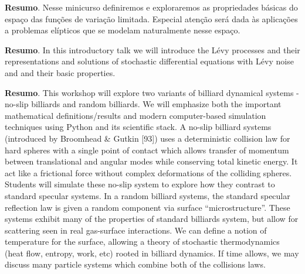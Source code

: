 	\vspace{24pt}


	
	
	\noindent\textbf{Resumo}.\label{mtop} 
	Nesse minicurso definiremos e exploraremos as propriedades básicas do espaço das funções de variação limitada. Especial atenção será dada às aplicações a problemas elípticos que se modelam naturalmente nesse espaço.
	
	\vspace{24pt}
	
	
	
	\noindent\textbf{Resumo}.\label{mah} 
	In this introductory talk we will introduce the Lévy processes and their representations and solutions of stochastic differential equations with Lévy noise and and their basic properties. 
	
	\vspace{24pt}

	
	
	\noindent\textbf{Resumo}.\label{sc} 
	This workshop will explore two variants of billiard dynamical systems - no-slip billiards and random billiards. We will emphasize both the important mathematical definitions/results and modern computer-based simulation techniques using Python and its scientific stack.
	A no-slip billiard systems (introduced by Broomhead \& Gutkin [93]) uses a deterministic collision law for hard spheres with a single point of contact which allows transfer of momentum between translational and angular modes while conserving total kinetic energy. It act like a frictional force without complex deformations of the colliding spheres.  Students will simulate these no-slip system to explore how they contrast to standard specular systems.
	In a random billiard systems, the standard specular reflection law is given a random component via surface “microstructure”. These systems exhibit many of the properties of standard billiards system, but allow for scattering seen in real gas-surface interactions. We can define a notion of temperature for the surface, allowing a theory of stochastic thermodynamics (heat flow, entropy, work, etc) rooted in billiard dynamics. If time allows, we may discuss many particle systems which combine both of the collisions laws.
	
